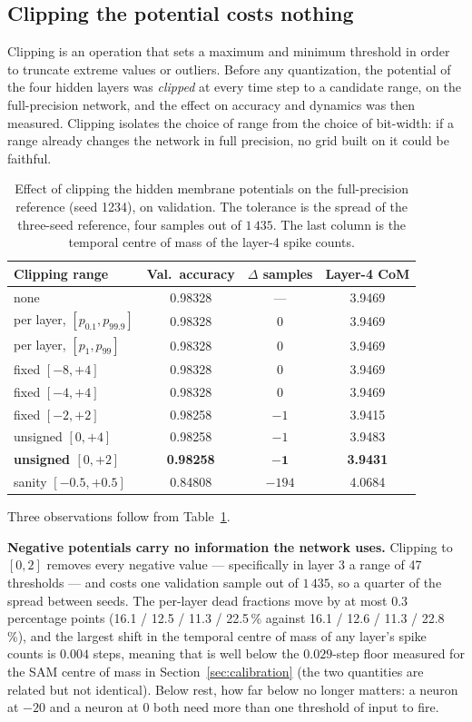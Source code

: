 \subsection{Clipping the potential costs nothing}

Clipping is an operation that sets a maximum and minimum threshold
in order to truncate extreme values or outliers.
Before any quantization, the potential of the four hidden layers was
\emph{clipped} at every time step to a candidate range, on the full-precision
network, and the effect on accuracy and dynamics was then measured. Clipping isolates
the choice of range from the choice of bit-width: if a range already changes the
network in full precision, no grid built on it could be faithful.

\begin{table}[htbp]
\centering
\begin{tabular}{lccc}
\toprule
Clipping range & Val.\ accuracy & $\Delta$ samples & Layer-4 CoM \\
\midrule
none                         & 0.98328 & ---  & 3.9469 \\
per layer, $[p_{0.1}, p_{99.9}]$ & 0.98328 & 0 & 3.9469 \\
per layer, $[p_{1}, p_{99}]$     & 0.98328 & 0 & 3.9469 \\
fixed $[-8, +4]$             & 0.98328 & 0    & 3.9469 \\
fixed $[-4, +4]$             & 0.98328 & 0    & 3.9469 \\
fixed $[-2, +2]$             & 0.98258 & $-1$ & 3.9415 \\
unsigned $[0, +4]$           & 0.98258 & $-1$ & 3.9483 \\
\textbf{unsigned $[0, +2]$}  & \textbf{0.98258} & $\mathbf{-1}$ & \textbf{3.9431} \\
sanity $[-0.5, +0.5]$        & 0.84808 & $-194$ & 4.0684 \\
\bottomrule
\end{tabular}
\caption{Effect of clipping the hidden membrane potentials on the
full-precision reference (seed 1234), on validation. The tolerance is the spread
of the three-seed reference, four samples out of $1\,435$. The last column is the
temporal centre of mass of the layer-4 spike counts.}
\label{tab:clipping}
\end{table}

Three observations follow from Table~\ref{tab:clipping}.

\textbf{Negative potentials carry no information the network uses.} Clipping to
$[0, 2]$ removes every negative value --- specifically in layer 3 a range of 47 thresholds ---
and costs one validation sample out of $1\,435$, so a quarter of the spread between
seeds. The per-layer dead fractions move by at most $0.3$ percentage points
(16.1 / 12.5 / 11.3 / 22.5\,\% against 16.1 / 12.6 / 11.3 / 22.8\,\%), and the
largest shift in the temporal centre of mass of any layer's spike counts is
$0.004$ steps, meaning that is well below the $0.029$-step floor measured for the SAM centre of
mass in Section~\ref{sec:calibration} (the two quantities are related but not
identical). Below rest, how far below no longer matters: a
neuron at $-20$ and a neuron at $0$ both need more than one threshold of input
to fire.

